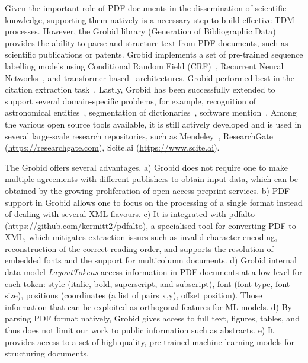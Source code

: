 Given the important role of PDF documents in the dissemination of scientific knowledge, supporting them natively is a necessary step to build effective TDM processes. 
However, the Grobid library (Generation of Bibliographic Data)~\cite{GROBID} provides the ability to parse and structure text from PDF documents, such as scientific publications or patents.
Grobid implements a set of pre-trained sequence labelling models using Conditional Random Field (CRF)~\cite{lafferty2001conditional}, Recurrent Neural Networks~\cite{lample2016neural}, and transformer-based~\cite{devlin2018bert} architectures.
Grobid performed best in the citation extraction task~\cite{tkaczyk2018evaluation}. Lastly, Grobid has been successfully extended to support several domain-specific problems, for example, recognition of astronomical entities~\cite{grobid-astro}, segmentation of dictionaries~\cite{khemakhem2017automatic}, software mention~\cite{software-mentions}. 
Among the various open source tools available, it is still actively developed and is used in several large-scale research repositories, such as Mendeley~\cite{mendeley-extraction}, ResearchGate (\url{https://researchgate.com}), Scite.ai (\url{https://www.scite.ai}). 

The Grobid offers several advantages. 
a) Grobid does not require one to make multiple agreements with different publishers to obtain input data, which can be obtained by the growing proliferation of open access preprint services. 
b) PDF support in Grobid allows one to focus on the processing of a single format instead of dealing with several XML flavours. 
c) It is integrated with pdfalto (\url{https://github.com/kermitt2/pdfalto}), a specialised tool for converting PDF to XML, which mitigates extraction issues such as invalid character encoding, reconstruction of the correct reading order, and supports the resolution of embedded fonts and the support for multicolumn documents. 
d) Grobid internal data model \textit{LayoutTokens} access information in PDF documents at a low level for each token: style (italic, bold, superscript, and subscript), font (font type, font size), positions (coordinates (a list of pairs x,y), offset position). Those information that can be exploited as orthogonal features for ML models.  
d) By parsing PDF format natively, Grobid gives access to full text, figures, tables, and thus does not limit our work to public information such as abstracts.
e) It provides access to a set of high-quality, pre-trained machine learning models for structuring documents.

